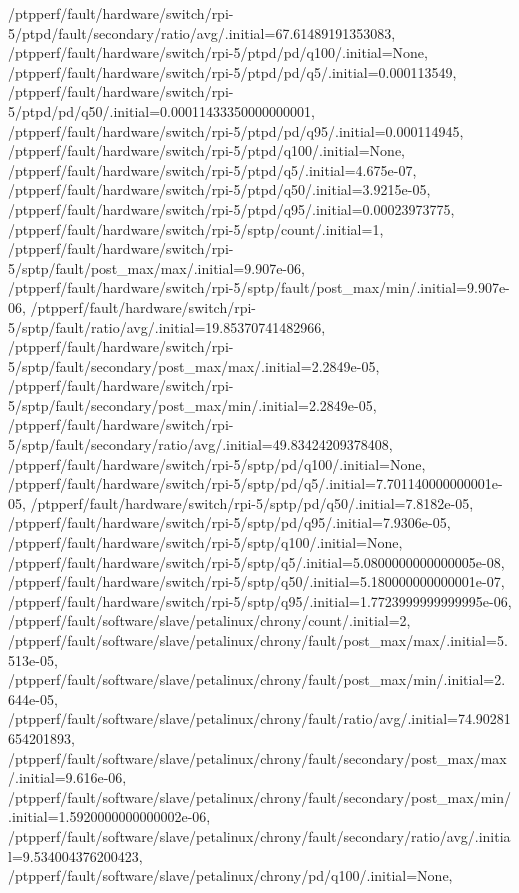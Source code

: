 {    /ptpperf/fault/hardware/switch/rpi-5/ptpd/fault/secondary/ratio/avg/.initial=67.61489191353083,
    /ptpperf/fault/hardware/switch/rpi-5/ptpd/pd/q100/.initial=None,
    /ptpperf/fault/hardware/switch/rpi-5/ptpd/pd/q5/.initial=0.000113549,
    /ptpperf/fault/hardware/switch/rpi-5/ptpd/pd/q50/.initial=0.00011433350000000001,
    /ptpperf/fault/hardware/switch/rpi-5/ptpd/pd/q95/.initial=0.000114945,
    /ptpperf/fault/hardware/switch/rpi-5/ptpd/q100/.initial=None,
    /ptpperf/fault/hardware/switch/rpi-5/ptpd/q5/.initial=4.675e-07,
    /ptpperf/fault/hardware/switch/rpi-5/ptpd/q50/.initial=3.9215e-05,
    /ptpperf/fault/hardware/switch/rpi-5/ptpd/q95/.initial=0.00023973775,
    /ptpperf/fault/hardware/switch/rpi-5/sptp/count/.initial=1,
    /ptpperf/fault/hardware/switch/rpi-5/sptp/fault/post_max/max/.initial=9.907e-06,
    /ptpperf/fault/hardware/switch/rpi-5/sptp/fault/post_max/min/.initial=9.907e-06,
    /ptpperf/fault/hardware/switch/rpi-5/sptp/fault/ratio/avg/.initial=19.85370741482966,
    /ptpperf/fault/hardware/switch/rpi-5/sptp/fault/secondary/post_max/max/.initial=2.2849e-05,
    /ptpperf/fault/hardware/switch/rpi-5/sptp/fault/secondary/post_max/min/.initial=2.2849e-05,
    /ptpperf/fault/hardware/switch/rpi-5/sptp/fault/secondary/ratio/avg/.initial=49.83424209378408,
    /ptpperf/fault/hardware/switch/rpi-5/sptp/pd/q100/.initial=None,
    /ptpperf/fault/hardware/switch/rpi-5/sptp/pd/q5/.initial=7.701140000000001e-05,
    /ptpperf/fault/hardware/switch/rpi-5/sptp/pd/q50/.initial=7.8182e-05,
    /ptpperf/fault/hardware/switch/rpi-5/sptp/pd/q95/.initial=7.9306e-05,
    /ptpperf/fault/hardware/switch/rpi-5/sptp/q100/.initial=None,
    /ptpperf/fault/hardware/switch/rpi-5/sptp/q5/.initial=5.0800000000000005e-08,
    /ptpperf/fault/hardware/switch/rpi-5/sptp/q50/.initial=5.180000000000001e-07,
    /ptpperf/fault/hardware/switch/rpi-5/sptp/q95/.initial=1.7723999999999995e-06,
    /ptpperf/fault/software/slave/petalinux/chrony/count/.initial=2,
    /ptpperf/fault/software/slave/petalinux/chrony/fault/post_max/max/.initial=5.513e-05,
    /ptpperf/fault/software/slave/petalinux/chrony/fault/post_max/min/.initial=2.644e-05,
    /ptpperf/fault/software/slave/petalinux/chrony/fault/ratio/avg/.initial=74.90281654201893,
    /ptpperf/fault/software/slave/petalinux/chrony/fault/secondary/post_max/max/.initial=9.616e-06,
    /ptpperf/fault/software/slave/petalinux/chrony/fault/secondary/post_max/min/.initial=1.5920000000000002e-06,
    /ptpperf/fault/software/slave/petalinux/chrony/fault/secondary/ratio/avg/.initial=9.534004376200423,
    /ptpperf/fault/software/slave/petalinux/chrony/pd/q100/.initial=None,
}
